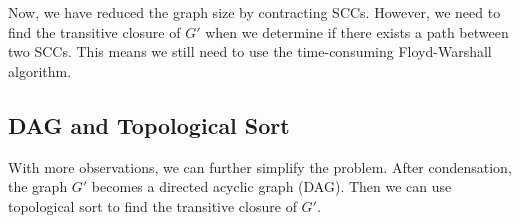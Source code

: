 \documentclass[a4paper,12pt]{article}
\newenvironment{claim}[1]{\par\noindent\underline{Claim:}\space#1}{}
\newenvironment{claimproof}[1]{\par\noindent\underline{Proof:}\space#1}{\hfill $\square$}
\begin{document}
\vspace{0.5cm}

Now, we have reduced the graph size by contracting SCCs.
However, we need to find the transitive closure of $G'$ when we determine if there exists a path between two SCCs.
This means we still need to use the time-consuming Floyd-Warshall algorithm.

\subsection{DAG and Topological Sort}

With more observations, we can further simplify the problem.
After condensation, the graph $G'$ becomes a directed acyclic graph (DAG).
Then we can use topological sort to find the transitive closure of $G'$.



\vspace{0.5cm}
\end{document}
